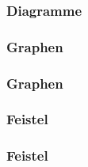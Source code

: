 \begin{frame}
\frametitle{Diagramme}
	
\end{frame}

\begin{frame}
\frametitle{Graphen}
\begin{figure}[!h]

\end{figure}
\end{frame}

\begin{frame}
\frametitle{Graphen}
	
\end{frame}

\begin{frame}
\frametitle{Feistel}
\begin{figure}[!h]

\end{figure}
\end{frame}

\begin{frame}
\frametitle{Feistel}
	
\end{frame}

